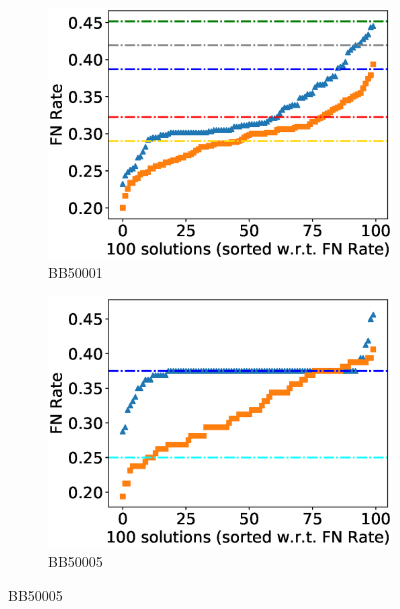 \begin{figure}[!htbp]
	
	\begin{adjustwidth}{-1cm}{-1cm}
		\centering
		\begin{subfigure}{0.22\textwidth}
			\includegraphics[width=\columnwidth]{Figure/summary/precomputedInit/Balibase/BB50001_fnrate_density_single_run}
			\caption{BB50001}
		\end{subfigure}	
		\begin{subfigure}{0.22\textwidth}
			\includegraphics[width=\columnwidth]{Figure/summary/precomputedInit/Balibase/BB50005_fnrate_density_single_run}
			\caption{BB50005}
		\end{subfigure}

\end{adjustwidth}
\end{figure}
